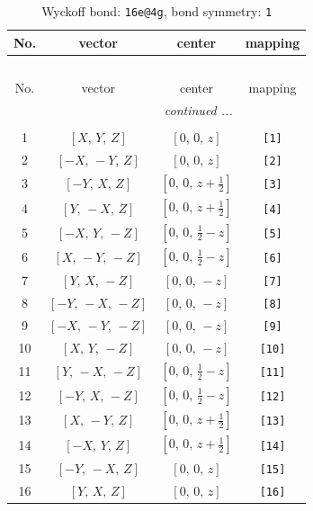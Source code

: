 \documentclass[fleqn,8pt]{jsarticle}
\begin{document}
\begin{longtable}{cccc}
\caption{Wyckoff bond: {\tt 16e@4g}, bond symmetry: {\tt 1}}
 \\
 \hline \hline
No. & vector & center & mapping \\ \hline \endfirsthead

\multicolumn{3}{l}{\tablename\ \thetable{}} \\
 \hline \hline
No. & vector & center & mapping \\ \hline \endhead

 \hline \hline
\multicolumn{3}{r}{\footnotesize\it continued ...} \\ \endfoot

 \hline \hline
\multicolumn{3}{r}{} \\ \endlastfoot

1 & $\left[ X,\, Y,\, Z \right]$ & $\left[ 0,\, 0,\, z \right]$ & {\tt [1]} \\ \hline
2 & $\left[ - X,\, - Y,\, Z \right]$ & $\left[ 0,\, 0,\, z \right]$ & {\tt [2]} \\ \hline
3 & $\left[ - Y,\, X,\, Z \right]$ & $\left[ 0,\, 0,\, z + \frac{1}{2} \right]$ & {\tt [3]} \\ \hline
4 & $\left[ Y,\, - X,\, Z \right]$ & $\left[ 0,\, 0,\, z + \frac{1}{2} \right]$ & {\tt [4]} \\ \hline
5 & $\left[ - X,\, Y,\, - Z \right]$ & $\left[ 0,\, 0,\, \frac{1}{2} - z \right]$ & {\tt [5]} \\ \hline
6 & $\left[ X,\, - Y,\, - Z \right]$ & $\left[ 0,\, 0,\, \frac{1}{2} - z \right]$ & {\tt [6]} \\ \hline
7 & $\left[ Y,\, X,\, - Z \right]$ & $\left[ 0,\, 0,\, - z \right]$ & {\tt [7]} \\ \hline
8 & $\left[ - Y,\, - X,\, - Z \right]$ & $\left[ 0,\, 0,\, - z \right]$ & {\tt [8]} \\ \hline
9 & $\left[ - X,\, - Y,\, - Z \right]$ & $\left[ 0,\, 0,\, - z \right]$ & {\tt [9]} \\ \hline
10 & $\left[ X,\, Y,\, - Z \right]$ & $\left[ 0,\, 0,\, - z \right]$ & {\tt [10]} \\ \hline
11 & $\left[ Y,\, - X,\, - Z \right]$ & $\left[ 0,\, 0,\, \frac{1}{2} - z \right]$ & {\tt [11]} \\ \hline
12 & $\left[ - Y,\, X,\, - Z \right]$ & $\left[ 0,\, 0,\, \frac{1}{2} - z \right]$ & {\tt [12]} \\ \hline
13 & $\left[ X,\, - Y,\, Z \right]$ & $\left[ 0,\, 0,\, z + \frac{1}{2} \right]$ & {\tt [13]} \\ \hline
14 & $\left[ - X,\, Y,\, Z \right]$ & $\left[ 0,\, 0,\, z + \frac{1}{2} \right]$ & {\tt [14]} \\ \hline
15 & $\left[ - Y,\, - X,\, Z \right]$ & $\left[ 0,\, 0,\, z \right]$ & {\tt [15]} \\ \hline
16 & $\left[ Y,\, X,\, Z \right]$ & $\left[ 0,\, 0,\, z \right]$ & {\tt [16]} \\
\end{longtable}
\end{document}
